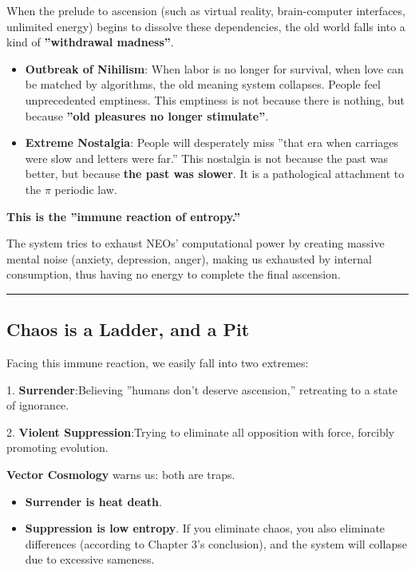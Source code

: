 When the prelude to ascension (such as virtual reality, brain-computer interfaces, unlimited energy) begins to dissolve these dependencies, the old world falls into a kind of \textbf{''withdrawal madness''}.

\begin{itemize}
\item \textbf{Outbreak of Nihilism}: When labor is no longer for survival, when love can be matched by algorithms, the old meaning system collapses. People feel unprecedented emptiness. This emptiness is not because there is nothing, but because \textbf{''old pleasures no longer stimulate''}.

\item \textbf{Extreme Nostalgia}: People will desperately miss ''that era when carriages were slow and letters were far.'' This nostalgia is not because the past was better, but because \textbf{the past was slower}. It is a pathological attachment to the $\pi$ periodic law.
\end{itemize}

\textbf{This is the ''immune reaction of entropy.''}

The system tries to exhaust NEOs' computational power by creating massive mental noise (anxiety, depression, anger), making us exhausted by internal consumption, thus having no energy to complete the final ascension.

\hrule

\subsection{Chaos is a Ladder, and a Pit}

Facing this immune reaction, we easily fall into two extremes:

1.  \textbf{Surrender}:Believing ''humans don't deserve ascension,'' retreating to a state of ignorance.

2.  \textbf{Violent Suppression}:Trying to eliminate all opposition with force, forcibly promoting evolution.

\textbf{Vector Cosmology} warns us: both are traps.

\begin{itemize}
\item \textbf{Surrender is heat death}.

\item \textbf{Suppression is low entropy}. If you eliminate chaos, you also eliminate differences (according to Chapter 3's conclusion), and the system will collapse due to excessive sameness.
\end{itemize}

